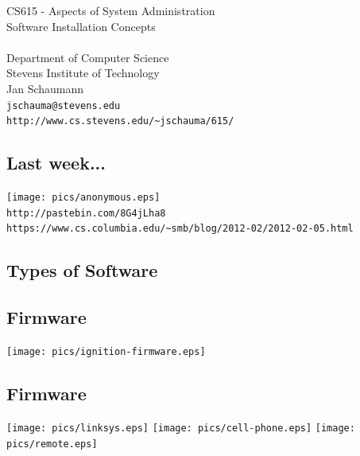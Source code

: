 \documentclass[xga]{xdvislides}
\begin{document}
\setfontphv

\lhead{\slidetitle}                               %
\cfoot{\relax}                               %
\rfoot{\Gray{\today}}

\vspace*{\fill}
\begin{center}
	\Hugesize
		CS615 - Aspects of System Administration\\ [1em]
		Software Installation Concepts \\ [1em]
	\hspace*{5mm}\blueline\\ [1em]
	\Normalsize
		Department of Computer Science\\
		Stevens Institute of Technology\\
		Jan Schaumann\\
		\verb+jschauma@stevens.edu+ \\
		\verb+http://www.cs.stevens.edu/~jschauma/615/+
\end{center}
\vspace*{\fill}

\subsection{Last week...}
\begin{center}
	\texttt{[image: pics/anonymous.eps]}
\\
{\tt http://pastebin.com/8G4jLha8}
\\
{\tt https://www.cs.columbia.edu/\~{}smb/blog/2012-02/2012-02-05.html}
\end{center}

\subsection{Types of Software}
\subsection{Firmware}
\begin{center}
	\texttt{[image: pics/ignition-firmware.eps]}
\end{center}

\subsection{Firmware}
\begin{center}
	\texttt{[image: pics/linksys.eps]}
	\texttt{[image: pics/cell-phone.eps]}
	\texttt{[image: pics/remote.eps]}
\end{center}
\end{document}
